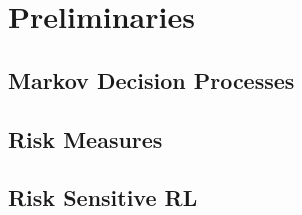 \chapter{Preliminaries}\label{ch:prelims}

\section{Markov Decision Processes}

\section{Risk Measures}

\section{Risk Sensitive RL}
